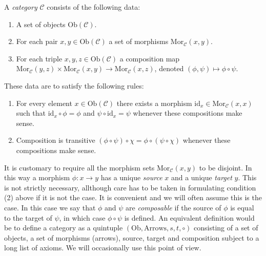 \begin{definition}
\label{definition-category}
A {\it category} $\mathcal{C}$ consists of the following data:
\begin{enumerate}
\item A set of objects $\text{Ob}(\mathcal{C})$.
\item For each pair $x,y \in \text{Ob}(\mathcal{C})$ a set of morphisms
$\text{Mor}_\mathcal{C}(x,y)$.
\item For each triple $x,y,z\in \text{Ob}(\mathcal{C})$ a composition
map $ \text{Mor}_\mathcal{C}(y,z) \times \text{Mor}_\mathcal{C}(x,y) 
\to \text{Mor}_\mathcal{C}(x,z) $, denoted $(\phi, \psi) \mapsto 
\phi \circ \psi$.
\end{enumerate}
These data are to satisfy the following rules:
\begin{enumerate}
\item For every element $x\in \text{Ob}(\mathcal{C})$ there exists a
morphism $\text{id}_x\in \text{Mor}_\mathcal{C}(x,x)$ such that 
$\text{id}_x \circ \phi = \phi$ and $\psi \circ \text{id}_x = \psi $ whenever
these compositions make sense.
\item Composition is transitive $(\phi \circ \psi) \circ \chi =
\phi \circ ( \psi \circ \chi)$ whenever these compositions make sense.
\end{enumerate}
\end{definition}

\noindent
It is customary to require all the morphism sets
$\text{Mor}_{\mathcal{C}}(x,y)$ to be disjoint.
In this way a morphism $\phi: x \to y$ has a unique {\it source} $x$
and a unique {\it target} $y$. This is not strictly necessary,
allthough care has to be taken in formulating condition (2) above
if it is not the case. It is convenient and we will often assume
this is the case. In this case we say that $\phi$ and $\psi$ are
{\it composable} if the source of $\phi$ is equal to the 
target of $\psi$, in which case $\phi \circ \psi$ is defined.
An equivalent definition would be to define a category
as a quintuple $(\text{Ob}, \text{Arrows}, s, t, \circ)$
consisting of a set of objects, a set of morphisms (arrows),
source, target and composition subject to a long list of axioms.
We will occasionally use this point of view.

